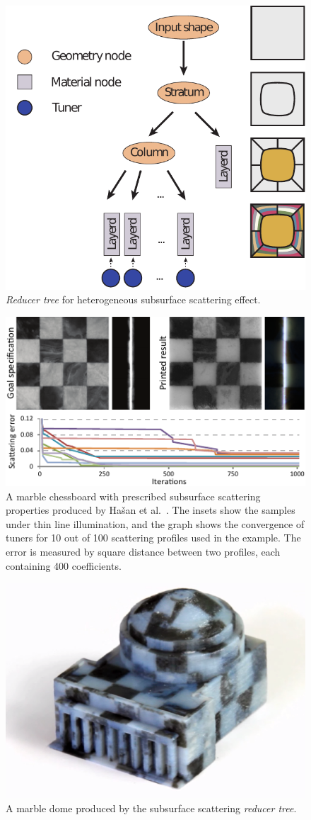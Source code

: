 \begin{figure}
\centering
\includegraphics[width=0.5\linewidth]{figure/treeSubs.pdf}
\caption{
	\emph{Reducer tree} for heterogeneous subsurface scattering effect.}
\label{fig:treeSubs}
\end{figure}

\begin{figure}
\centering
\includegraphics[width=0.65\linewidth]{figure/fig_chess.pdf}
\caption{
	A marble chessboard with prescribed subsurface scattering properties produced by Ha\v{s}an et al.~.
	The insets show the samples under thin line illumination, and the graph shows the convergence of tuners for 10 out of 100 scattering profiles used in the example. The error is measured by square distance between two profiles, each containing 400 coefficients.}
\label{fig:sub}
\end{figure}

\begin{figure}
\centering
\includegraphics[width=0.45\linewidth]{figure/dome.png}
\caption{
	A marble dome produced by the subsurface scattering \emph{reducer tree}.}
\label{fig:dome}
\end{figure}

